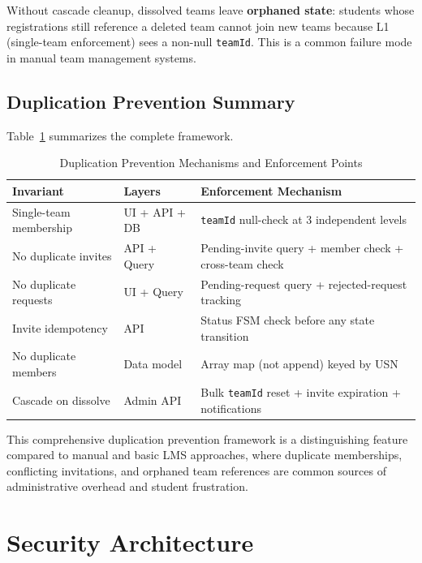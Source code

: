 \documentclass[conference]{IEEEtran}
\begin{document}
Without cascade cleanup, dissolved teams leave \textbf{orphaned state}: students whose registrations still reference a deleted team cannot join new teams because L1 (single-team enforcement) sees a non-null \texttt{teamId}. This is a common failure mode in manual team management systems.

\subsection{Duplication Prevention Summary}

Table~\ref{tab:duplication} summarizes the complete framework.

\begin{table}[htbp]
\centering
\caption{Duplication Prevention Mechanisms and Enforcement Points}
\label{tab:duplication}
\footnotesize
\renewcommand{\arraystretch}{1.15}
\begin{tabular}{@{}p{2.0cm}p{1.4cm}p{3.2cm}@{}}
\toprule
\textbf{Invariant} & \textbf{Layers} & \textbf{Enforcement Mechanism} \\
\midrule
Single-team membership & UI + API + DB & \texttt{teamId} null-check at 3 independent levels \\
No duplicate invites & API + Query & Pending-invite query + member check + cross-team check \\
No duplicate requests & UI + Query & Pending-request query + rejected-request tracking \\
Invite idempotency & API & Status FSM check before any state transition \\
No duplicate members & Data model & Array map (not append) keyed by USN \\
Cascade on dissolve & Admin API & Bulk \texttt{teamId} reset + invite expiration + notifications \\
\bottomrule
\end{tabular}
\end{table}

This comprehensive duplication prevention framework is a distinguishing feature compared to manual and basic LMS approaches, where duplicate memberships, conflicting invitations, and orphaned team references are common sources of administrative overhead and student frustration.

\section{Security Architecture}
\label{sec:security}
\end{document}
